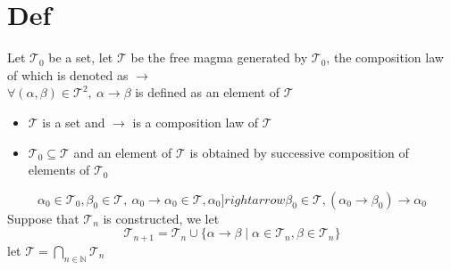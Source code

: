 \documentclass{book}
\begin{document}
\section{Def}
Let $\mathcal{T}_0$ be a set, let $\mathcal{T}$ be the free magma generated by $\mathcal{T}_0$, the composition law of which is denoted as $\rightarrow$\\
$\forall(\alpha,\beta)\in \mathcal{T}^2,\ \alpha\rightarrow\beta$ is defined as an element of $\mathcal{T}$
\begin{itemize}
    \item $\mathcal{T}$ is a set and $\rightarrow$ is a composition law of $\mathcal{T}$
    \item $\mathcal{T}_0\subseteq\mathcal{T}$ and an element of $\mathcal{T}$ is obtained by successive composition of elements of $\mathcal{T}_0$
\end{itemize}
$$\alpha_0\in \mathcal{T}_0,\beta_0\in \mathcal{T},\ \alpha_0\rightarrow\alpha_0\in \mathcal{T},\alpha_0]rightarrow\beta_0\in \mathcal{T},(\alpha_0\rightarrow\beta_0)\rightarrow\alpha_0$$
Suppose that $\mathcal{T}_n$ is constructed, we let $$\mathcal{T}_{n+1}=\mathcal{T}_n\cup\{\alpha\rightarrow\beta\mid\alpha\in \mathcal{T}_n,\beta\in \mathcal{T}_n\}$$
let $\mathcal{T}=\bigcap\limits_{n\in \mathbb{N}}\mathcal{T}_n$
\end{document}
